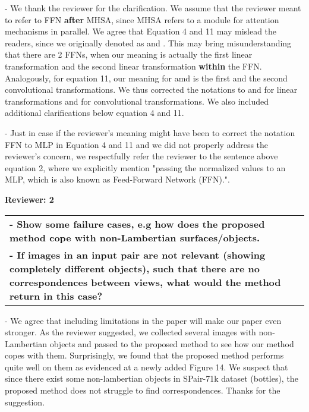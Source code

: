\documentclass[11pt,draftclsnofoot,onecolumn]{IEEEtran}
\begin{document}
- We thank the reviewer for the clarification. We assume that the reviewer meant to refer to FFN \textbf{after} MHSA, since MHSA refers to a module for attention mechanisms in parallel. We agree that Equation 4 and 11 may mislead the readers, since we originally denoted as  and . This may bring misunderstanding that there are 2 FFNs, when our meaning is actually the first linear transformation and the second linear transformation \textbf{within} the FFN. Analogously, for equation 11, our meaning for  amd  is the first and the second convolutional transformations. We thus corrected the notations to  and  for linear transformations   and  for convolutional transformations. We also included additional clarifications below equation 4 and 11.

- Just in case if the reviewer's meaning might have been to correct the notation FFN to MLP in Equation 4 and 11 and we did not properly address the reviewer's concern,  we respectfully refer the reviewer to the sentence above equation 2, where we explicitly mention "passing the normalized values to an MLP, which
is also known as Feed-Forward Network (FFN).".





\newpage
\noindent \large\textbf{Reviewer: 2}
\begin{longtable}{|p{16cm}|}
	\hline 
	
		
	\textbf{- Show some failure cases, e.g how does the proposed method cope with non-Lambertian surfaces/objects.  }\\
	
	\textbf{- If images in an input pair are not relevant (showing completely different objects), such that there are no correspondences between views, what would the method return in this case? }\\

	
	
	\hline
\end{longtable}
- We agree that including limitations in the paper will make our paper even stronger. As the reviewer suggested, we collected several images with non-Lambertian objects and passed to the proposed method to see how our method copes with them. Surprisingly, we found that the proposed method performs quite well on them as evidenced at a newly added Figure 14. We suspect that since there exist some non-lambertian objects in SPair-71k dataset (bottles), the proposed method does not struggle to find correspondences. Thanks for the suggestion. 
\end{document}
